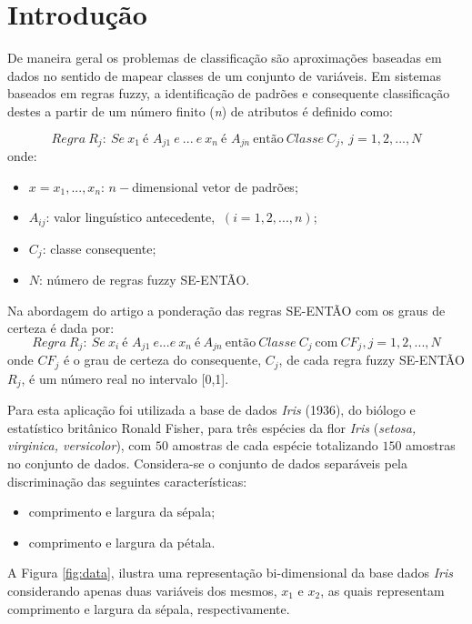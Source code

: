 \documentclass[12pt,a4paper]{article}
\numberwithin{equation}{section}
\begin{document}
\section{Introdução}

De maneira geral os problemas de classificação são aproximações baseadas em dados  no sentido de mapear classes de um conjunto de variáveis. Em sistemas baseados em regras fuzzy, a identificação de padrões e consequente classificação destes a partir de um número finito (\textit{n}) de atributos é definido como:

\begin{equation} \label{eq:eq1}
Regra~R_{j}:~Se~x_{1}~ \text{é }A_{j1}~e~...~e~x_{n}~\text{é }A_{jn}~\text{então}~Classe~C_{j},~j=1,2,...,N
\end{equation}
onde:
\begin{itemize}
\item $x={x_{1},...,x_{n}}$: $n-$dimensional vetor de padrões;
\item $A_{ij}$: valor linguístico antecedente, $~(i=1,2,...,n)$;
\item $C_{j}$: classe consequente;
\item $N$: número de regras fuzzy SE-ENTÃO.
\end{itemize}

Na abordagem do artigo a ponderação das regras SE-ENTÃO com os graus de certeza é dada por:
\begin{equation} \label{eq:eq2}
Regra~R_{j}:~Se~x_{i}~\text{é } A_{j1}~e...e~x_{n}~\text{é}~A_{jn}~\text{então}~Classe~C_{j}~\text{com}~CF_{j}, j=1,2,...,N
\end{equation}
onde $CF_{j}$ é o grau de certeza do consequente, $C_{j}$, de cada regra fuzzy SE-ENTÃO $R_{j}$, é um número real no intervalo [0,1].

Para esta aplicação foi utilizada a base de dados \textit{Iris} (1936), do biólogo e estatístico britânico Ronald Fisher, para três espécies da flor \textit{Iris} (\textit{setosa, virginica, versicolor}), com $50$ amostras de cada espécie totalizando $150$ amostras no conjunto de dados. Considera-se o conjunto de dados separáveis pela discriminação das seguintes características:

\begin{itemize}
\item comprimento e largura da sépala;
\item comprimento e largura da pétala.
\end{itemize}

A Figura \ref{fig:data}, ilustra uma representação bi-dimensional da base dados \textit{Iris} considerando apenas duas variáveis dos mesmos, $x_1$ e $x_2$, as quais representam comprimento e largura da sépala, respectivamente.
\end{document}
